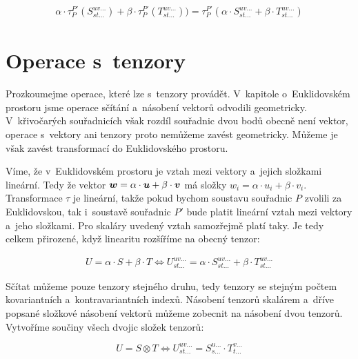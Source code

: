\begin{equation}
\label{eq:linearni_transformace_tenzoru}
\begin{split}
\alpha \cdot \tau_{P}^{P'}(S_{st...}^{uv...}) + \beta \cdot \tau_{P}^{P'}(T_{st...}^{uv...})) = \tau_{P}^{P'}(\alpha \cdot S_{st...}^{uv...} + \beta \cdot T_{st...}^{uv...})
\end{split}
\end{equation}

\section{Operace s~tenzory}

Prozkoumejme operace, které lze s~tenzory provádět. V~kapitole o~Euklidovském prostoru jsme operace sčítání a~násobení vektorů odvodili geometricky. V~křivočarých souřadnicích však rozdíl souřadnic dvou bodů obecně není vektor, operace s~vektory ani tenzory proto nemůžeme zavést geometricky. Můžeme je však zavést transformací do Euklidovského prostoru.

Víme, že v~Euklidovském prostoru je vztah mezi vektory a~jejich složkami lineární. Tedy že vektor \(\boldsymbol{w} = \alpha \cdot \boldsymbol{u} + \beta \cdot \boldsymbol{v}\) má složky \(w_i = \alpha \cdot u_i + \beta \cdot v_i\). Transformace \(\tau\) je lineární, takže pokud bychom soustavu souřadnic \(P\) zvolili za Euklidovskou, tak i~soustavě souřadnic \(P'\) bude platit lineární vztah mezi vektory a~jeho složkami. Pro skaláry uvedený vztah samozřejmě platí taky. Je tedy celkem přirozené, když linearitu rozšíříme na obecný tenzor:

\begin{equation}
\label{eq:scitani_a_nasobeni_tenzoru}
\begin{split}
U = \alpha \cdot S + \beta \cdot T \Leftrightarrow U_{st...}^{uv...} = \alpha \cdot S_{st...}^{uv...} + \beta \cdot T_{st...}^{uv...}
\end{split}
\end{equation}

Sčítat můžeme pouze tenzory stejného druhu, tedy tenzory se stejným počtem kovariantních a~kontravariantních indexů. Násobení tenzorů skalárem a~dříve popsané složkové násobení vektorů můžeme zobecnit na násobení dvou tenzorů. Vytvoříme součiny všech dvojic složek tenzorů:

\begin{equation}
\label{eq:nasobeni_tenzoru}
U = S \otimes T \Leftrightarrow U_{st...}^{uv...} = S_{s...}^{u...} \cdot T_{t...}^{v...}
\end{equation}

